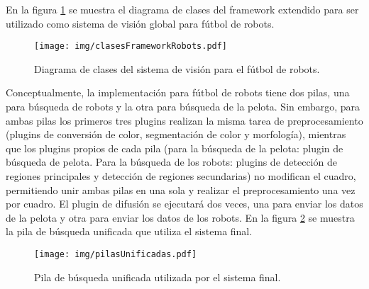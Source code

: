 En la figura \ref{clasesFrameworkRobots} se muestra el diagrama de clases del
framework extendido para ser utilizado como sistema de visión global para
fútbol de robots.

\begin{figure}[!htb]

	\texttt{[image: img/clasesFrameworkRobots.pdf]}

	\caption{Diagrama de clases del sistema de visión para el fútbol
	de robots.}

	\label{clasesFrameworkRobots}

\end{figure}

Conceptualmente, la implementación para fútbol de robots tiene dos pilas, una
para búsqueda de robots y la otra para búsqueda de la pelota. Sin embargo, para
ambas pilas los primeros tres plugins realizan la misma tarea de
preprocesamiento (plugins de conversión de color, segmentación de color y
morfología), mientras que los plugins propios de cada pila (para la búsqueda de
la pelota: plugin de búsqueda de pelota. Para la búsqueda de los robots: plugins
de detección de regiones principales y detección de regiones secundarias) no
modifican el cuadro, permitiendo unir ambas pilas en una sola y realizar el
preprocesamiento una vez por cuadro. El plugin de difusión se ejecutará dos
veces, una para enviar los datos de la pelota y otra para enviar los datos de
los robots. En la figura \ref{pilasUnificadas} se muestra la pila de búsqueda
unificada que utiliza el sistema final.

\begin{figure}[!htb]

	\centering

	\texttt{[image: img/pilasUnificadas.pdf]}

	\caption{Pila de búsqueda unificada utilizada por el sistema final.}

	\label{pilasUnificadas}

\end{figure}
